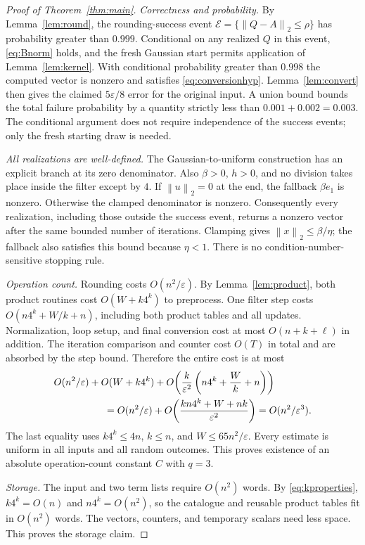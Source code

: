 \documentclass[11pt,a4paper]{article}
\theoremstyle{remark}
\newcommand{\eps}{\varepsilon}
\newcommand{\norm}[1]{\left\|#1\right\|_2}
\begin{document}
\begin{proof}[Proof of Theorem~\ref{thm:main}]
\textit{Correctness and probability.}
By Lemma~\ref{lem:round}, the rounding-success event
$\mathcal E=\{\norm{Q-A}\le\rho\}$ has probability greater than $0.999$.
Conditional on any realized $Q$ in this event, \eqref{eq:Bnorm} holds, and
the fresh Gaussian start permits application of Lemma~\ref{lem:kernel}.
With conditional probability greater than $0.998$ the computed vector is
nonzero and satisfies \eqref{eq:conversionhyp}. Lemma~\ref{lem:convert}
then gives the claimed $5\eps/8$ error for the original input.
A union bound bounds the total failure probability by a quantity strictly
less than $0.001+0.002=0.003$. The conditional argument does not require
independence of the success events; only the fresh starting draw is needed.

\textit{All realizations are well-defined.}
The Gaussian-to-uniform construction has an explicit branch at its zero
denominator. Also $\beta>0$, $h>0$, and no division takes place inside the
filter except by $4$. If $\norm{u}=0$ at the end, the fallback $\beta e_1$
is nonzero. Otherwise the clamped denominator is nonzero. Consequently every
realization, including those outside the success event, returns a nonzero
vector after the same bounded number of iterations. Clamping gives
$\norm{x}\le\beta/\eta$; the fallback also satisfies this bound because
$\eta<1$. There is no condition-number-sensitive stopping rule.

\textit{Operation count.}
Rounding costs $O(n^2/\eps)$. By Lemma~\ref{lem:product}, both product
routines cost $O(W+k4^k)$ to preprocess. One filter step costs
$O(n4^k+W/k+n)$, including both product tables and all updates.
Normalization, loop setup, and final conversion cost at most $O(n+k+\ell)$
in addition. The iteration comparison and counter cost $O(T)$ in total and
are absorbed by the step bound. Therefore the entire cost is at most
\begin{align}
 &O(n^2/\eps)+O(W+k4^k)
   +O\!\left(\frac{k}{\eps^2}
                  \left(n4^k+\frac Wk+n\right)\right) \notag\\
 &\hspace{18mm}=O(n^2/\eps)
   +O\!\left(\frac{kn4^k+W+nk}{\eps^2}\right)
   =O(n^2/\eps^3).\label{eq:finalcost}
\end{align}
The last equality uses $k4^k\le4n$, $k\le n$, and
$W\le65n^2/\eps$. Every estimate is uniform in all inputs and all random
outcomes. This proves existence of an absolute operation-count constant $C$
with $q=3$.

\textit{Storage.}
The input and two term lists require $O(n^2)$ words.
By \eqref{eq:kproperties}, $k4^k=O(n)$ and $n4^k=O(n^2)$, so the catalogue
and reusable product tables fit in $O(n^2)$ words. The vectors, counters,
and temporary scalars need less space. This proves the storage claim.
\end{proof}
\end{document}
